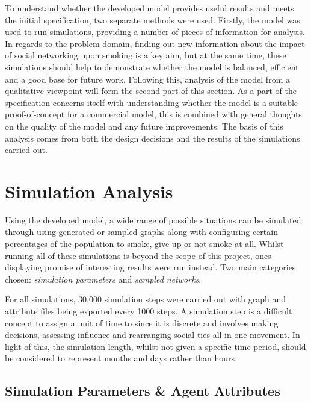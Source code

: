 \documentclass[]{report}
\begin{document}
To understand whether the developed model provides useful results and meets the initial specification, two separate methods were used. Firstly, the model was used to run simulations, providing a number of pieces of information for analysis. In regards to the problem domain, finding out new information about the impact of social networking upon smoking is a key aim, but at the same time, these simulations should help to demonstrate whether the model is balanced, efficient and a good base for future work. Following this, analysis of the model from a qualitative viewpoint will form the second part of this section. As a part of the specification concerns itself with understanding whether the model is a suitable proof-of-concept for a commercial model, this is combined with general thoughts on the quality of the model and any future improvements. The basis of this analysis comes from both the design decisions and the results of the simulations carried out.

\section{Simulation Analysis}
Using the developed model, a wide range of possible situations can be simulated through using generated or sampled graphs along with configuring certain percentages of the population to smoke, give up or not smoke at all. Whilst running all of these simulations is beyond the scope of this project, ones displaying promise of interesting results were run instead. Two main categories chosen: \emph{simulation parameters} and \emph{sampled networks}.

For all simulations, 30,000 simulation steps were carried out with graph and attribute files being exported every 1000 steps. A simulation step is a difficult concept to assign a unit of time to since it is discrete and involves making decisions, assessing influence and rearranging social ties all in one movement. In light of this, the simulation length, whilst not given a specific time period, should be considered to represent months and days rather than hours.

\subsection{Simulation Parameters \& Agent Attributes}
\end{document}
